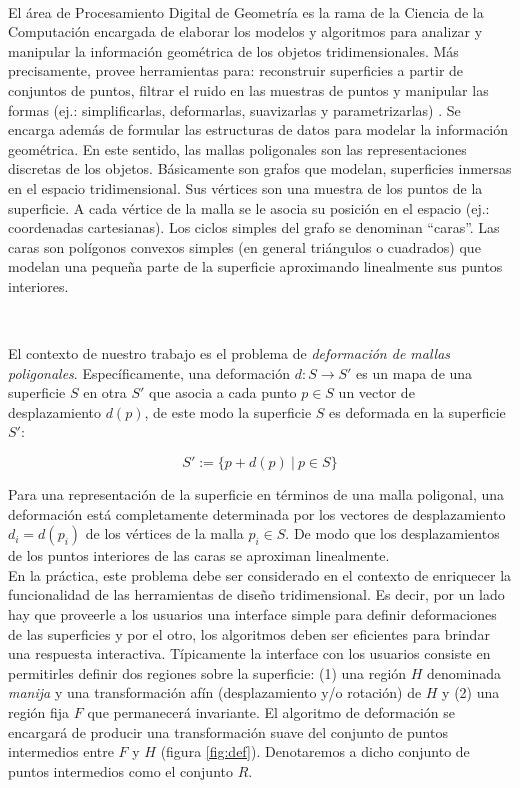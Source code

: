 \documentclass{article}
\begin{document}
\

El área de Procesamiento Digital de Geometría es la rama de la Ciencia 
de la Computación encargada de elaborar los modelos y algoritmos para 
analizar y manipular la información geométrica de los objetos 
tridimensionales. Más precisamente, provee herramientas para: reconstruir 
superficies a partir de conjuntos de puntos, filtrar el ruido en las 
muestras de puntos y manipular las formas (ej.: simplificarlas, deformarlas,
 suavizarlas y parametrizarlas) \cite{BKPAL:2010}. Se encarga además de 
 formular las estructuras de datos para modelar la información geométrica. 
 En este sentido, las mallas poligonales son las representaciones discretas 
 de los  objetos. Básicamente son grafos \cite{Harari:1969} que modelan, 
 superficies inmersas en el espacio tridimensional. Sus vértices son  
 una muestra de los puntos de la superficie. A cada vértice de la 
 malla se le asocia su posición en el espacio (ej.: coordenadas cartesianas). 
 Los ciclos simples del grafo se denominan “caras”. Las caras son polígonos 
 convexos simples (en general triángulos o cuadrados) que modelan una pequeña 
 parte de la superficie aproximando linealmente sus puntos interiores.

\

El contexto de nuestro trabajo es el problema de \emph{deformación de mallas 
poligonales}. Específicamente, una deformación $d: S \rightarrow S'$ es un 
mapa de una superficie $S$ en otra $S'$ que asocia a cada punto $p \in S$ 
un vector de desplazamiento $d(p)$, de este modo la superficie $S$ es 
deformada en la superficie $S'$:

$$S' := \{p + d(p) \ | \ p \in S\}$$

Para una representación de la superficie en términos de una malla poligonal, 
una deformación está completamente determinada por los vectores de desplazamiento 
$d_i = d(p_i)$ de los vértices de la malla $p_i \in S$. De modo que los 
desplazamientos de los puntos interiores de las caras se aproximan linealmente. \\
En la práctica, este problema debe ser considerado en el contexto de enriquecer 
la funcionalidad de las herramientas de diseño tridimensional. Es decir, por 
un lado hay que proveerle a los usuarios una interface simple para definir 
deformaciones de las superficies y por el otro, los algoritmos deben ser eficientes 
para brindar una respuesta interactiva. Típicamente la interface con los 
usuarios consiste en permitirles definir dos regiones sobre la superficie: 
(1) una región $H$ denominada \emph{manija} y una transformación afín (desplazamiento 
y/o rotación) de $H$ y (2) una región fija $F$ que permanecerá invariante. 
El algoritmo de deformación se encargará de producir una transformación 
suave del conjunto de puntos intermedios entre $F$ y $H$ (figura \ref{fig:def}). 
Denotaremos a dicho conjunto de puntos intermedios como el conjunto $R$. 
\end{document}
